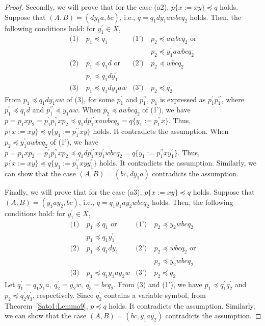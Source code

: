\begin{proof}
  Secondly, we will prove that for the case (a2), $p \{ x := xy \} \preceq q$ holds. Suppose that $(A, B) = (dy_{1}a, bc)$, i.e., $q = q_{1}dy_{1}awbcq_{2} $ holds. Then, the following conditions hold: for $y_{1}^{\prime}\in X$,
  \begin{align*}
    \textrm{(1)}~& p_{1} \preceq q_{1} & \textrm{(1')}~& p_{2} \preceq awbcq_{2}\mbox{ or} \\
    & & & p_{2} \preceq y_{1}^{\prime}awbcq_{2}\\
    \textrm{(2)}~& p_{1} \preceq q_{1}d\mbox{ or}  & \textrm{(2')}~& p_{2} \preceq wbcq_{2}\\
    & p_{1} \preceq q_{1}dy_{1}^{\prime} & & \\
    \textrm{(3)}~& p_{1} \preceq q_{1}dy_{1}aw & \textrm{(3')}~& p_{2} \preceq q_{2}
  \end{align*}
  From $p_{1} \preceq q_{1}dy_{1}aw$ of (3), for some $p^{\prime}_{1}$ and $p^{\prime\prime}_{1}$, $p_{1}$ is expressed as $p^{\prime}_{1}p^{\prime\prime}_{1}$, where $p^{\prime}_{1} \preceq q_{1}d$ and $p^{\prime\prime}_{1} \preceq y_{1}aw$. 
  When $p_{2} \preceq awbcq_{2}$ of (1'), we have $p=p_{1}xp_{2}=p^{\prime}_{1}p^{\prime\prime}_{1}xp_{2} \preceq q_{1}dp^{\prime\prime}_{1}xawbcq_{2}=q \{ y_{1}:=p^{\prime\prime}_{1}x \}$.
  Thus, $p \{ x := xy \} \preceq q \{ y_{1}:=p^{\prime\prime}_{1}xy \}$ holds. It contradicts the assumption.
  When $p_{2} \preceq y_{1}^{\prime}awbcq_{2}$ of (1'), we have $p=p_{1}xp_{2}=p^{\prime}_{1}p^{\prime\prime}_{1}xp_{2} \preceq q_{1}dp^{\prime\prime}_{1}xy_{1}^{\prime}wbcq_{2}=q \{ y_{1}:=p^{\prime\prime}_{1}xy_{1}^{\prime} \}$.
  Thus, $p \{ x := xy \} \preceq q \{ y_{1}:=p^{\prime\prime}_{1}xyy_{1}^{\prime} \}$ holds. It contradicts the assumption.
  Similarly, we can show that the case $(A, B) = (bc, dy_{1}a)$ contradicts the assumption.
  
  Finally, we will prove that for the case (a3), $p \{ x := xy \} \preceq q$ holds. Suppose that $(A, B) = (y_{1}ay_{2}, bc)$, i.e., $q = q_{1}y_{1}ay_{2}wbcq_{2} $ holds. Then, the following conditions hold: for $y_{1}^{\prime}\in X$,
  \begin{align*}
    \textrm{(1)}~& p_{1} \preceq q_{1}\mbox{ or} & \textrm{(1')}~& p_{2} \preceq y_{2}wbcq_{2} \\
    & p_{1} \preceq q_{1}y_{1}^{\prime} & & \\
    \textrm{(2)}~& p_{1} \preceq q_{1}dy_{1} & \textrm{(2')}~& p_{2} \preceq wbcq_{2}\mbox{ or}\\    
    & & & p_{2} \preceq y_{2}^{\prime}wbcq_{2} \\
    \textrm{(3)}~& p_{1} \preceq q_{1}y_{1}ay_{2}w & \textrm{(3')}~& p_{2} \preceq q_{2}
  \end{align*}
  Let $q^{\prime}_{1}=q_{1}y_{1}a,~q^{\prime}_{2}=y_{2}w,~q^{\prime}_{3}=bcq_{2}$. From (3) and (1'), we have $p_{1} \preceq q^{\prime}_{1}q^{\prime}_{2}$ and $p_{2} \preceq q^{\prime}_{2}q^{\prime}_{3}$, respectively. Since $q_{2}^{\prime}$ contains a variable symbol,
  from Theorem~\ref{Sato1:Lemma9}, $p \preceq q$ holds. It contradicts the assumption.
  Similarly, we can show that the case $(A, B) = (bc, y_{1}ay_{2})$ contradicts the assumption.
  

\end{proof}
